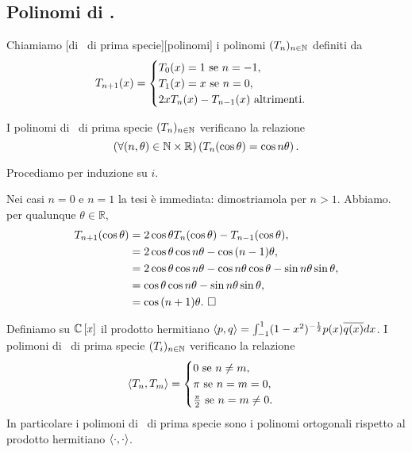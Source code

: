 \subsection{Polinomi di \Chebyshev.}
\label{IstituzioniDiAnalisiNumerici_AltriPolinomiOrtogonalSpecifici}
\begin{Definition}
	Chiamiamo [di \Chebyshev\ di prima specie][polinomi] i polinomi $(T_n)_{n \in \mathbb{N}}$ definiti da
	\[
		T_{n + 1}(x) =
		\begin{cases}
			T_0(x) = 1\text{ se }n = - 1,\\
			T_1(x) = x\text{ se }n = 0,\\
			2xT_n(x) - T_{n - 1}(x)\text{ altrimenti}.
		\end{cases}
	\]
\end{Definition}
\begin{Theorem}
	I polinomi di \Chebyshev\ di prima specie $(T_n)_{n \in \mathbb{N}}$ verificano la relazione
\[
	\left ( \forall (n,\theta) \in \mathbb{N} \times \mathbb{R} \right ) \left ( T_n(\cos{\theta}) = \cos{n \theta} \right ).
\]
\end{Theorem}
\Proof Procediamo per induzione su $i$.
\par Nei casi $n = 0$ e $n = 1$ la tesi \`e immediata: dimostriamola per $n > 1$. Abbiamo. per qualunque $\theta \in \mathbb{R}$,
\begin{align*}
	T_{n + 1}(\cos{\theta})
	&= 2 \cos{\theta} T_n(\cos{\theta}) - T_{n - 1}(\cos{\theta}),\\
	&= 2 \cos{\theta} \cos{n \theta} - \cos{(n - 1) \theta},\\
	&= 2 \cos{\theta} \cos{n \theta} - \cos{n\theta} \cos{\theta} - \sin{n\theta} \sin{\theta},\\
	&= \cos{\theta} \cos{n \theta} - \sin{n\theta} \sin{\theta},\\
	&= \cos{(n + 1) \theta}.\text{ $\square$}
\end{align*}
\begin{Corollary}
	Definiamo su $\mathbb{C} \left [ x \right ]$ il prodotto hermitiano $\left \langle p , q \right \rangle = \int_{-1}^1 (1 - x^2)^{-\frac{1}{2}} p(x)\overline{q(x)}dx$. I polimoni di \Chebyshev\ di prima specie $(T_i)_{n \in \mathbb{N}}$ verificano la relazione
	\[
		\left \langle T_n , T_m \right \rangle =
		\begin{cases}
			0\text{ se }n \neq m,\\
			\pi\text{ se }n = m = 0,\\
			\frac{\pi}{2}\text{ se }n = m \neq 0.
		\end{cases}
	\]
	In particolare i polimoni di \Chebyshev\ di prima specie sono i polinomi ortogonali rispetto al prodotto hermitiano $\left \langle \cdot , \cdot \right \rangle$.
\end{Corollary}
